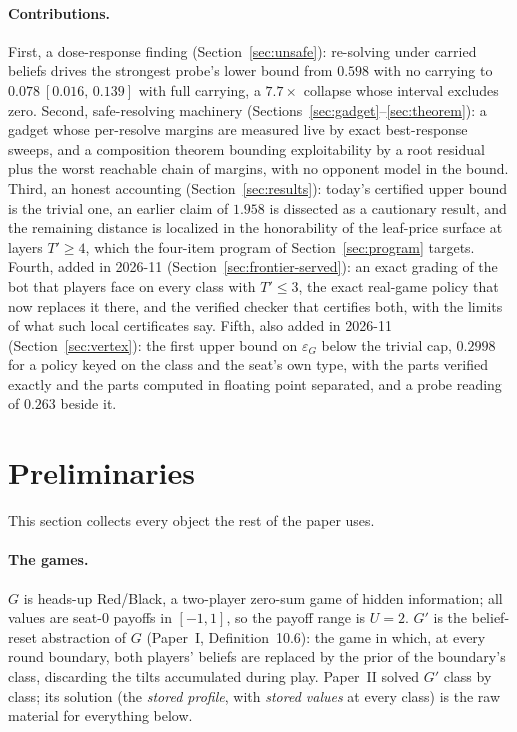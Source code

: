 \documentclass[11pt]{article}
\theoremstyle{plain}
\theoremstyle{definition}
\theoremstyle{remark}
\newcommand{\game}{\ensuremath{G}}
\newcommand{\gp}{\ensuremath{G'}}
\newcommand{\epsG}{\ensuremath{\varepsilon_{\game}}}
\begin{document}
\paragraph{Contributions.} First, a dose-response finding
(Section~\ref{sec:unsafe}): re-solving under carried beliefs drives
the strongest probe's lower bound from $0.598$ with no carrying to
$0.078\ [0.016,\,0.139]$ with full carrying, a $7.7\times$ collapse
whose interval excludes zero.
Second, safe-resolving machinery
(Sections~\ref{sec:gadget}--\ref{sec:theorem}): a gadget whose
per-resolve margins are measured live by exact best-response sweeps,
and a composition theorem bounding exploitability by a root residual
plus the worst reachable chain of margins, with no opponent model in
the bound. Third, an honest accounting (Section~\ref{sec:results}):
today's certified upper bound is the trivial one, an earlier claim of
$1.958$ is dissected as a cautionary result, and the remaining
distance is localized in the honorability of the leaf-price surface at
layers $T'\ge4$, which the four-item program of
Section~\ref{sec:program} targets. Fourth, added in 2026-11
(Section~\ref{sec:frontier-served}): an exact grading of the bot that
players face on every class with $T'\le3$, the exact real-game policy
that now replaces it there, and the verified checker that certifies
both, with the limits of what such local certificates say. Fifth,
also added in 2026-11 (Section~\ref{sec:vertex}): the first upper bound
on $\epsG$ below the trivial cap, $0.2998$ for a policy keyed on the
class and the seat's own type, with the parts verified exactly and the
parts computed in floating point separated, and a probe reading of
$0.263$ beside it.

\section{Preliminaries}\label{sec:prelim}

This section collects every object the rest of the paper uses.

\paragraph{The games.} $\game$ is heads-up Red/Black, a two-player
zero-sum game of hidden information; all values are seat-0 payoffs in
$[-1,1]$, so the payoff range is $U=2$. $\gp$ is the belief-reset
abstraction of $\game$ (Paper~I, Definition~10.6): the game in which,
at every round boundary, both players' beliefs are replaced by the
prior of the boundary's class, discarding the tilts accumulated during
play. Paper~II solved $\gp$ class by class; its solution (the
\emph{stored profile}, with \emph{stored values} at every class) is
the raw material for everything below.
\end{document}
